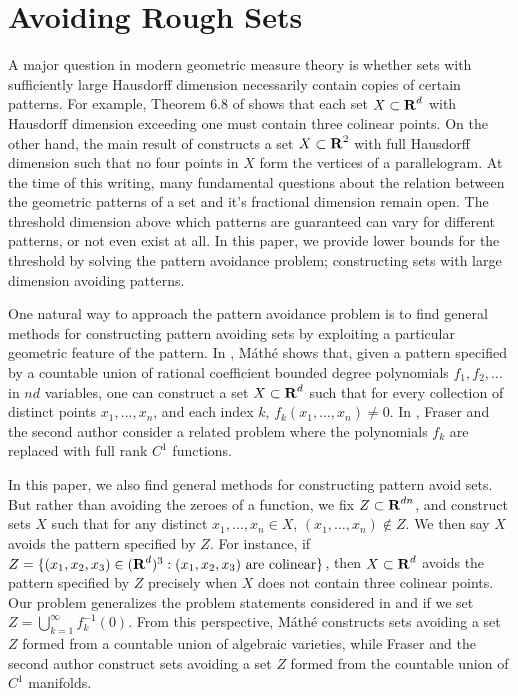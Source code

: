 
\chapter{Avoiding Rough Sets}
\label{ch:RoughSets}

A major question in modern geometric measure theory is whether sets with sufficiently large Hausdorff dimension necessarily contain copies of certain patterns. For example, Theorem 6.8 of \cite{Matilla} shows that each set $X \subset \operatorname{\mathbf{R}}^d$ with Hausdorff dimension exceeding one must contain three colinear points. On the other hand, the main result of \cite{Maga} constructs a set $X \subset \operatorname{\mathbf{R}}^2$ with full Hausdorff dimension such that no four points in $X$ form the vertices of a parallelogram. At the time of this writing, many fundamental questions about the relation between the geometric patterns of a set and it's fractional dimension remain open. The threshold dimension above which patterns are guaranteed can vary for different patterns, or not even exist at all. In this paper, we provide lower bounds for the threshold by solving the pattern avoidance problem; constructing sets with large dimension avoiding patterns.

One natural way to approach the pattern avoidance problem is to find general methods for constructing pattern avoiding sets by exploiting a particular geometric feature of the pattern. In \cite{Mathe}, M\'{a}th\'{e} shows that, given a pattern specified by a countable union of rational coefficient bounded degree polynomials $f_1, f_2, \dots$ in $nd$ variables, one can construct a set $X \subset \operatorname{\mathbf{R}}^d$ such that for every collection of distinct points $x_1, \dots, x_n$, and each index $k$, $f_k(x_1, \dots, x_n) \neq 0$. In \cite{MalabikaRob}, Fraser and the second author consider a related problem where the polynomials $f_k$ are replaced with full rank $C^1$ functions.


In this paper, we also find general methods for constructing pattern avoid sets. But rather than avoiding the zeroes of a function, we fix $Z \subset \operatorname{\mathbf{R}}^{dn}$, and construct sets $X$ such that for any distinct $x_1, \dots, x_n \in X$, $(x_1, \dots, x_n) \not \in Z$. We then say $X$ avoids the pattern specified by $Z$. For instance, if $Z = \{ (x_1,x_2,x_3) \in (\operatorname{\mathbf{R}}^d)^3 : (x_1,x_2,x_3)\ \text{are colinear} \}$, then $X \subset \operatorname{\mathbf{R}}^d$ avoids the pattern specified by $Z$ precisely when $X$ does not contain three colinear points. Our problem generalizes the problem statements considered in \cite{Mathe} and \cite{MalabikaRob} if we set $Z = \bigcup_{k = 1}^\infty f_k^{-1}(0)$. From this perspective, M\'{a}th\'{e} constructs sets avoiding a set $Z$ formed from a countable union of algebraic varieties, while Fraser and the second author construct sets avoiding a set $Z$ formed from the countable union of $C^1$ manifolds.

